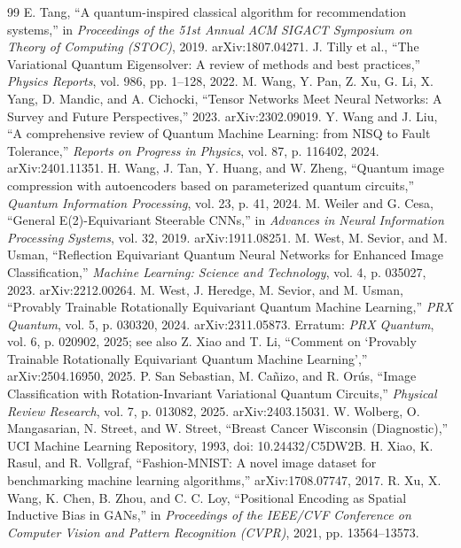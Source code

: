 \documentclass[11pt]{article}
\begin{document}
\begin{thebibliography}{99}
 E. Tang, ``A quantum-inspired classical algorithm for recommendation systems,'' in \textit{Proceedings of the 51st Annual ACM SIGACT Symposium on Theory of Computing (STOC)}, 2019. arXiv:1807.04271.
 J. Tilly et al., ``The Variational Quantum Eigensolver: A review of methods and best practices,'' \textit{Physics Reports}, vol. 986, pp. 1--128, 2022.
 M. Wang, Y. Pan, Z. Xu, G. Li, X. Yang, D. Mandic, and A. Cichocki, ``Tensor Networks Meet Neural Networks: A Survey and Future Perspectives,'' 2023. arXiv:2302.09019.
 Y. Wang and J. Liu, ``A comprehensive review of Quantum Machine Learning: from NISQ to Fault Tolerance,'' \textit{Reports on Progress in Physics}, vol. 87, p. 116402, 2024. arXiv:2401.11351.
 H. Wang, J. Tan, Y. Huang, and W. Zheng, ``Quantum image compression with autoencoders based on parameterized quantum circuits,'' \textit{Quantum Information Processing}, vol. 23, p. 41, 2024.
 M. Weiler and G. Cesa, ``General E(2)-Equivariant Steerable CNNs,'' in \textit{Advances in Neural Information Processing Systems}, vol. 32, 2019. arXiv:1911.08251.
 M. West, M. Sevior, and M. Usman, ``Reflection Equivariant Quantum Neural Networks for Enhanced Image Classification,'' \textit{Machine Learning: Science and Technology}, vol. 4, p. 035027, 2023. arXiv:2212.00264.
 M. West, J. Heredge, M. Sevior, and M. Usman, ``Provably Trainable Rotationally Equivariant Quantum Machine Learning,'' \textit{PRX Quantum}, vol. 5, p. 030320, 2024. arXiv:2311.05873. Erratum: \textit{PRX Quantum}, vol. 6, p. 020902, 2025; see also Z. Xiao and T. Li, ``Comment on `Provably Trainable Rotationally Equivariant Quantum Machine Learning','' arXiv:2504.16950, 2025.
 P. San Sebastian, M. Ca\~{n}izo, and R. Or\'us, ``Image Classification with Rotation-Invariant Variational Quantum Circuits,'' \textit{Physical Review Research}, vol. 7, p. 013082, 2025. arXiv:2403.15031.
 W. Wolberg, O. Mangasarian, N. Street, and W. Street, ``Breast Cancer Wisconsin (Diagnostic),'' UCI Machine Learning Repository, 1993, doi: 10.24432/C5DW2B.
 H. Xiao, K. Rasul, and R. Vollgraf, ``Fashion-MNIST: A novel image dataset for benchmarking machine learning algorithms,'' arXiv:1708.07747, 2017.
 R. Xu, X. Wang, K. Chen, B. Zhou, and C. C. Loy, ``Positional Encoding as Spatial Inductive Bias in GANs,'' in \textit{Proceedings of the IEEE/CVF Conference on Computer Vision and Pattern Recognition (CVPR)}, 2021, pp. 13564--13573.

\end{thebibliography}
\end{document}

